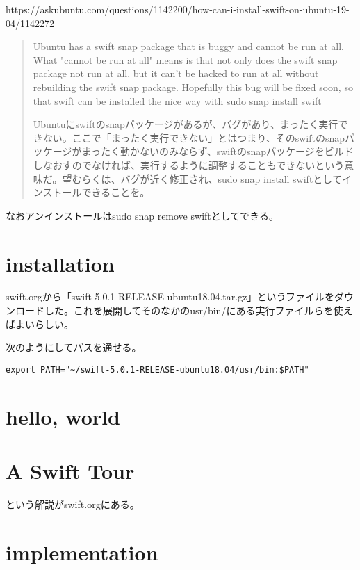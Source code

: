 \documentclass[uplatex,dvipdfmx]{jsarticle} \usepackage{amsmath,amssymb,bm}
\begin{document}
https://askubuntu.com/questions/1142200/how-can-i-install-swift-on-ubuntu-19-04/1142272

\begin{quotation}
Ubuntu has a swift snap package that is buggy and cannot be run at all. What "cannot be run at all" means is that not only does the swift snap package not run at all, but it can't be hacked to run at all without rebuilding the swift snap package. Hopefully this bug will be fixed soon, so that swift can be installed the nice way with sudo snap install swift

Ubuntuにswiftのsnapパッケージがあるが、バグがあり、まったく実行できない。ここで「まったく実行できない」とはつまり、そのswiftのsnapパッケージがまったく動かないのみならず、swiftのsnapパッケージをビルドしなおすのでなければ、実行するように調整することもできないという意味だ。望むらくは、バグが近く修正され、sudo snap install swiftとしてインストールできることを。
\end{quotation}

なおアンインストールはsudo snap remove swiftとしてできる。



\section*{installation}
swift.orgから「swift-5.0.1-RELEASE-ubuntu18.04.tar.gz」というファイルをダウンロードした。これを展開してそのなかのusr/bin/にある実行ファイルらを使えばよいらしい。

次のようにしてパスを通せる。

\verb|export PATH="~/swift-5.0.1-RELEASE-ubuntu18.04/usr/bin:$PATH"|



\section*{hello, world}




\section*{A Swift Tour}
という解説がswift.orgにある。



\section*{implementation}

\end{document}
